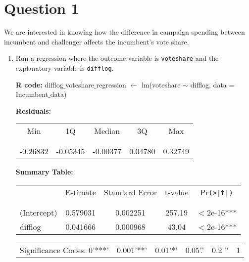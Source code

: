 \documentclass[12pt,letterpaper]{article}
\begin{document}
	\section*{Question 1}
	\vspace{.25cm}
	\noindent We are interested in knowing how the difference in campaign spending between incumbent and challenger affects the incumbent's vote share. \vspace{.25cm}
	\begin{enumerate}
		\item Run a regression where the outcome variable is \texttt{voteshare} and the explanatory variable is \texttt{difflog}.
		
		\-\hspace{0.5cm}\textbf{R code:} difflog$\_$voteshare$\_$regression $\gets$ lm(voteshare $\sim$ difflog, data = Incumbent$\_$data)
		
		\vspace{0.5cm}
		\begin{table}[h!]
			\-\hspace{0.5cm}\textbf{Residuals:}
			\centering
			\begin{tabular}{c c c c c}
				Min & 1Q & Median & 3Q & Max \\
				\\[-1.8ex] 
				\hline \\[-1.8ex]
				-0.26832 & -0.05345 & -0.00377 & 0.04780 & 0.32749\\
			\end{tabular}
		\end{table}
		\vspace{0.5cm}
		\begin{table}[h!]
			\-\hspace{0.5cm}\textbf{Summary Table:}
			\centering
			\begin{tabular}{l | c c c c }
				& Estimate & Standard Error & t-value & Pr\texttt{(>|t|)} \\
				\\[-1.8ex] 
				\hline \\[-1.8ex]
				(Intercept) & 0.579031 & 0.002251 & 257.19 & $<$2e-16*** \\
				difflog & 0.041666 & 0.000968 & 43.04 & $<$2e-16*** \\
			\end{tabular}
		\end{table}
		\vspace{0.5cm}
		\begin{table}[h!]
			\centering
			\begin{tabular}{c c c c c c}
				\\[-1.8ex] 
				Significance Codes: 0'***' & 0.001'**' & 0.01'*' & 0.05'.' & 0.2 '' & 1 \\
			\end{tabular}
		\end{table}
		

\end{enumerate}
\end{document}
